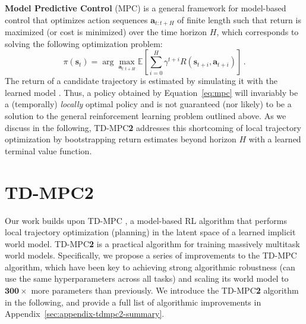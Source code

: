 \documentclass{article}
\begin{document}
\textbf{Model Predictive Control} (MPC) is a general framework for model-based control that optimizes action sequences $\mathbf{a}_{t:t+H}$ of finite length such that return is maximized (or cost is minimized) over the time horizon $H$, which corresponds to solving the following optimization problem:
\begin{equation}
    \label{eq:mpc}
    \pi(\mathbf{s}_{t}) = \arg\max_{\mathbf{a}_{t:t+H}} \mathbb{E}\left[ \sum_{i=0}^{H} \gamma^{t+i} R(\mathbf{s}_{t+i}, \mathbf{a}_{t+i}) \right]\,.
\end{equation}
The return of a candidate trajectory is estimated by simulating it with the learned model \citep{negenborn2005}. Thus, a policy obtained by Equation~\ref{eq:mpc} will invariably be a (temporally) \emph{locally} optimal policy and is not guaranteed (nor likely) to be a solution to the general reinforcement learning problem outlined above. As we discuss in the following, TD-MPC\textbf{2} addresses this shortcoming of local trajectory optimization by bootstrapping return estimates beyond horizon $H$ with a learned terminal value function.


\section{TD-MPC\textcolor{nhred}{\textbf{2}}}
\label{sec:tdmpc2}
Our work builds upon TD-MPC \citep{Hansen2022tdmpc}, a model-based RL algorithm that performs local trajectory optimization (planning) in the latent space of a learned implicit world model. TD-MPC\textbf{2} is a practical algorithm for training massively multitask world models. Specifically, we propose a series of improvements to the TD-MPC algorithm, which have been key to achieving strong algorithmic robustness (can use the same hyperparameters across all tasks) and scaling its world model to $\mathbf{300\times}$ more parameters than previously. We introduce the TD-MPC\textbf{2} algorithm in the following, and provide a full list of algorithmic improvements in Appendix~\ref{sec:appendix-tdmpc2-summary}.
\end{document}
